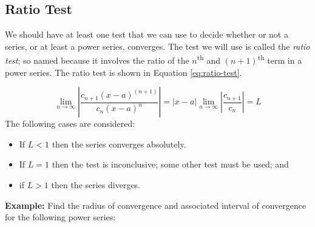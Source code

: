 \subsection{Ratio Test}
We should have at least one test that we can use to decide whether or not a series, or at least a power series, converges.  The test we will use is called the \emph{ratio test}; so named because it involves the ratio of the $n$\textsuperscript{th} and $(n+1)$\textsuperscript{th} term in a power series.  The ratio test is shown in Equation \ref{eq:ratio-test}.

\begin{equation}
\lim_{n \to \infty}\left|\frac{c_{n+1}(x-a)^{(n+1)}}{c_n(x-a)^n} \right| = \left|x-a \right| \lim_{n \to \infty} \left|\frac{c_{n+1}}{c_n} \right| = L
\label{eq:ratio-test}
\end{equation}
The following cases are considered:
\begin{itemize}
\item If $L<1$ then the series converges absolutely.
\item If $L = 1$ then the test is inconclusive; some other test must be used; and
\item if $L > 1$ then the series diverges.
\end{itemize}

\vspace{0.5cm}

\noindent\textbf{Example: } Find the radius of convergence and associated interval of convergence for the following power series:

